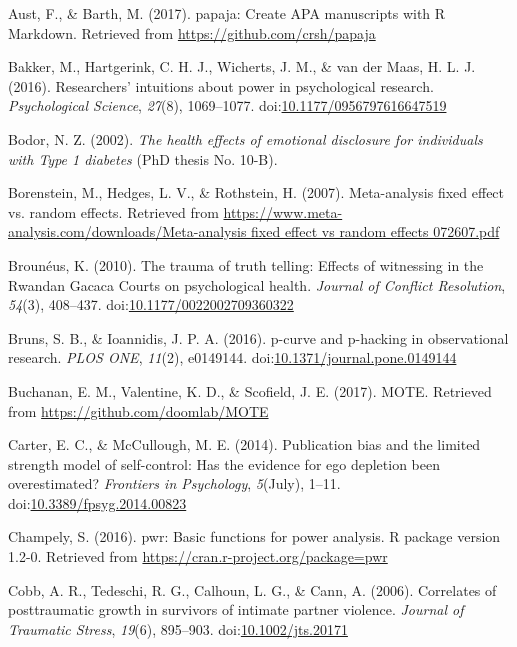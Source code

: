 \documentclass[man, mask]{apa6}
\theoremstyle{definition}
\theoremstyle{definition}
\theoremstyle{definition}
\theoremstyle{remark}
\begin{document}
\hypertarget{ref-Aust2017}{}
Aust, F., \& Barth, M. (2017). papaja: Create APA manuscripts with R
Markdown. Retrieved from \url{https://github.com/crsh/papaja}

\hypertarget{ref-Bakker2016}{}
Bakker, M., Hartgerink, C. H. J., Wicherts, J. M., \& van der Maas, H.
L. J. (2016). Researchers' intuitions about power in psychological
research. \emph{Psychological Science}, \emph{27}(8), 1069--1077.
doi:\href{https://doi.org/10.1177/0956797616647519}{10.1177/0956797616647519}

\hypertarget{ref-Bodor2002}{}
Bodor, N. Z. (2002). \emph{The health effects of emotional disclosure
for individuals with Type 1 diabetes} (PhD thesis No. 10-B).

\hypertarget{ref-Borenstein2007}{}
Borenstein, M., Hedges, L. V., \& Rothstein, H. (2007). Meta-analysis
fixed effect vs. random effects. Retrieved from
\href{https://www.meta-analysis.com/downloads/Meta-analysis\%20fixed\%20effect\%20vs\%20random\%20effects\%20072607.pdf}{https://www.meta-analysis.com/downloads/Meta-analysis fixed effect vs random effects 072607.pdf}

\hypertarget{ref-Brouneus2010}{}
Brounéus, K. (2010). The trauma of truth telling: Effects of witnessing
in the Rwandan Gacaca Courts on psychological health. \emph{Journal of
Conflict Resolution}, \emph{54}(3), 408--437.
doi:\href{https://doi.org/10.1177/0022002709360322}{10.1177/0022002709360322}

\hypertarget{ref-Bruns2016}{}
Bruns, S. B., \& Ioannidis, J. P. A. (2016). p-curve and p-hacking in
observational research. \emph{PLOS ONE}, \emph{11}(2), e0149144.
doi:\href{https://doi.org/10.1371/journal.pone.0149144}{10.1371/journal.pone.0149144}

\hypertarget{ref-Buchanan2017}{}
Buchanan, E. M., Valentine, K. D., \& Scofield, J. E. (2017). MOTE.
Retrieved from \url{https://github.com/doomlab/MOTE}

\hypertarget{ref-Carter2014}{}
Carter, E. C., \& McCullough, M. E. (2014). Publication bias and the
limited strength model of self-control: Has the evidence for ego
depletion been overestimated? \emph{Frontiers in Psychology},
\emph{5}(July), 1--11.
doi:\href{https://doi.org/10.3389/fpsyg.2014.00823}{10.3389/fpsyg.2014.00823}

\hypertarget{ref-Champely2016}{}
Champely, S. (2016). pwr: Basic functions for power analysis. R package
version 1.2-0. Retrieved from
\url{https://cran.r-project.org/package=pwr}

\hypertarget{ref-Cobb2006}{}
Cobb, A. R., Tedeschi, R. G., Calhoun, L. G., \& Cann, A. (2006).
Correlates of posttraumatic growth in survivors of intimate partner
violence. \emph{Journal of Traumatic Stress}, \emph{19}(6), 895--903.
doi:\href{https://doi.org/10.1002/jts.20171}{10.1002/jts.20171}
\end{document}
